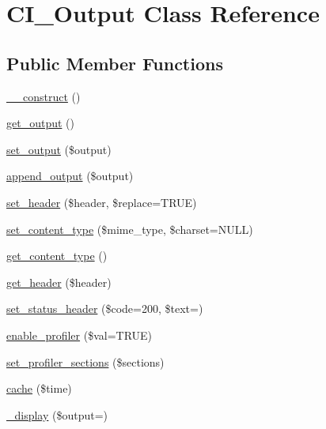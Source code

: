 \hypertarget{class_c_i___output}{}\section{C\+I\+\_\+\+Output Class Reference}
\label{class_c_i___output}
\subsection*{Public Member Functions}
\begin{DoxyCompactItemize}
\item 
\mbox{\hyperlink{class_c_i___output_a91c41a5901975381c86c88bf6b2fbb95}{\+\_\+\+\_\+construct}} ()
\item 
\mbox{\hyperlink{class_c_i___output_a3126fd4de0ed5dfb41d6965864b3390f}{get\+\_\+output}} ()
\item 
\mbox{\hyperlink{class_c_i___output_a42173e9cfc34dcb3558c2ab6352f1a79}{set\+\_\+output}} (\$output)
\item 
\mbox{\hyperlink{class_c_i___output_ac8f4e3da98de65caf01f3dd70737638d}{append\+\_\+output}} (\$output)
\item 
\mbox{\hyperlink{class_c_i___output_a226b4e343d8d9d7edcb88124ebe55985}{set\+\_\+header}} (\$header, \$replace=T\+R\+UE)
\item 
\mbox{\hyperlink{class_c_i___output_ae3495e01580cece2bcf1b1bb944dff11}{set\+\_\+content\+\_\+type}} (\$mime\+\_\+type, \$charset=N\+U\+LL)
\item 
\mbox{\hyperlink{class_c_i___output_a0c257f7a16a24b7e4d6d337b35137430}{get\+\_\+content\+\_\+type}} ()
\item 
\mbox{\hyperlink{class_c_i___output_a4490c73a2b039abb14a1fc0202da1ec1}{get\+\_\+header}} (\$header)
\item 
\mbox{\hyperlink{class_c_i___output_a1a4cee03a9a0d191e26e5e8898662d69}{set\+\_\+status\+\_\+header}} (\$code=200, \$text=\textquotesingle{}\textquotesingle{})
\item 
\mbox{\hyperlink{class_c_i___output_af0baa342f5a2f1b9111ae3e6b679ccf6}{enable\+\_\+profiler}} (\$val=T\+R\+UE)
\item 
\mbox{\hyperlink{class_c_i___output_a5eec9b34053c10c787e340e74d66fc98}{set\+\_\+profiler\+\_\+sections}} (\$sections)
\item 
\mbox{\hyperlink{class_c_i___output_ac8c5308abb4959e9f2804992cc768ba2}{cache}} (\$time)
\item 
\mbox{\hyperlink{class_c_i___output_a400d71167163b629d99d506d39402fd6}{\+\_\+display}} (\$output=\textquotesingle{}\textquotesingle{})

\end{DoxyCompactItemize}
